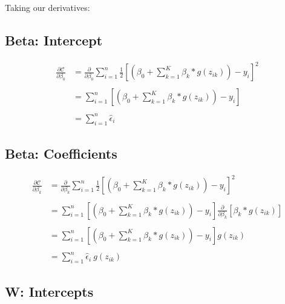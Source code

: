 \documentclass[
]{book}
\begin{document}
Taking our derivatives:

\hypertarget{beta-intercept}{%
\subsection{Beta: Intercept}\label{beta-intercept}}

\[
\begin{aligned}
\frac{\partial \mathcal{C}}{\partial \beta_0} &= \frac{\partial}{\partial \beta_0} \sum_{i = 1}^n \frac{1}{2} \left[\left(\beta_0 + \sum_{k = 1}^K \beta_k * g(z_{ik})\right) - y_i\right]^2 \\ \\
&= \sum_{i = 1}^n \left[\left(\beta_0 + \sum_{k = 1}^K \beta_k * g(z_{ik})\right) - y_i\right] \\ \\
&= \sum_{i = 1}^n \hat \epsilon_i
\end{aligned}
\]

\hypertarget{beta-coefficients}{%
\subsection{Beta: Coefficients}\label{beta-coefficients}}

\[
\begin{aligned}
\frac{\partial \mathcal{C}}{\partial \beta_k} &= \frac{\partial}{\partial \beta_k} \sum_{i = 1}^n \frac{1}{2} \left[\left(\beta_0 + \sum_{k = 1}^K \beta_k * g(z_{ik})\right) - y_i\right]^2 \\ \\
&= \sum_{i = 1}^n \left[\left(\beta_0 + \sum_{k = 1}^K \beta_k * g(z_{ik})\right) - y_i\right] \frac{\partial}{\partial \beta_k} [\beta_k * g(z_{ik})] \\ \\
&= \sum_{i = 1}^n \left[\left(\beta_0 + \sum_{k = 1}^K \beta_k * g(z_{ik})\right) - y_i\right] g(z_{ik}) \\ \\
&= \sum_{i = 1}^n \hat \epsilon_i \ g(z_{ik})
\end{aligned}
\]

\hypertarget{w-intercepts}{%
\subsection{W: Intercepts}\label{w-intercepts}}
\end{document}
